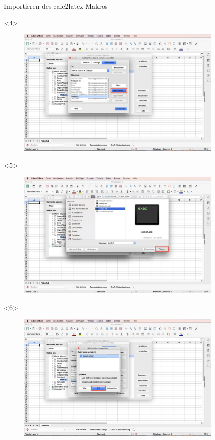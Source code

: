 \documentclass["WS\space 16-17\space -\space LaTeX-Kurs\space -\space Praesentation\space -\space 2.tex"]{subfiles}
\begin{document}
\begin{frame}[c]{Importieren des calc2latex-Makros}
\begin{onlyenv}
\begin{figure}[htbp]
		\end{figure}
	\end{onlyenv}
	\begin{onlyenv}
		\begin{figure}[htbp]
			\centering
			\includegraphics[width=0.9\textwidth]{img/Bildschirmfoto_mitKasten/1_Importieren_Macro/4.jpg}
		\end{figure}
	\end{onlyenv}
	\begin{onlyenv}
		\begin{figure}[htbp]
			\centering
			\includegraphics[width=0.9\textwidth]{img/Bildschirmfoto_mitKasten/1_Importieren_Macro/5.jpg}
		\end{figure}
	\end{onlyenv}
	\begin{onlyenv}
		\begin{figure}[htbp]
			\centering
			\includegraphics[width=0.9\textwidth]{img/Bildschirmfoto_mitKasten/1_Importieren_Macro/6.jpg}

\end{figure}
\end{onlyenv}
\end{frame}
\end{document}
